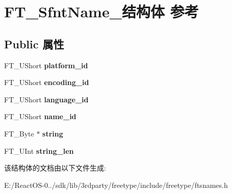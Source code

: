 \hypertarget{struct_f_t___sfnt_name__}{}\section{F\+T\+\_\+\+Sfnt\+Name\+\_\+结构体 参考}
\label{struct_f_t___sfnt_name__}
\subsection*{Public 属性}
\begin{DoxyCompactItemize}
\item 
\mbox{\label{struct_f_t___sfnt_name___ae92450a058eb4737df85f66226d69f43}} 
F\+T\+\_\+\+U\+Short {\bfseries platform\+\_\+id}
\item 
\mbox{\label{struct_f_t___sfnt_name___a01f4573605eab3f4d2e4b9b50b0de98f}} 
F\+T\+\_\+\+U\+Short {\bfseries encoding\+\_\+id}
\item 
\mbox{\label{struct_f_t___sfnt_name___a6fb23e0f299a97b25b63805b04cf1fc5}} 
F\+T\+\_\+\+U\+Short {\bfseries language\+\_\+id}
\item 
\mbox{\label{struct_f_t___sfnt_name___ac07be3e852408990fe0a910f00b68f4e}} 
F\+T\+\_\+\+U\+Short {\bfseries name\+\_\+id}
\item 
\mbox{\label{struct_f_t___sfnt_name___ab369e2c3d8dc9662f69c53e4d3158067}} 
F\+T\+\_\+\+Byte $\ast$ {\bfseries string}
\item 
\mbox{\label{struct_f_t___sfnt_name___a4ebdb7207b5681d16f9cc17f432cb56f}} 
F\+T\+\_\+\+U\+Int {\bfseries string\+\_\+len}
\end{DoxyCompactItemize}


该结构体的文档由以下文件生成\+:\begin{DoxyCompactItemize}
\item 
E\+:/\+React\+O\+S-\/0../sdk/lib/3rdparty/freetype/include/freetype/ftsnames.\+h\end{DoxyCompactItemize}
